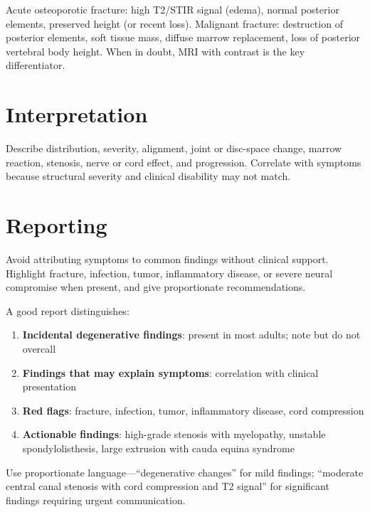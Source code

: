 \begin{pearlbox}
Acute osteoporotic fracture: high T2/STIR signal (edema), normal posterior elements, preserved height (or recent loss). Malignant fracture: destruction of posterior elements, soft tissue mass, diffuse marrow replacement, loss of posterior vertebral body height. When in doubt, MRI with contrast is the key differentiator.
\end{pearlbox}

\section{Interpretation}
Describe distribution, severity, alignment, joint or disc-space change, marrow reaction, stenosis, nerve or cord effect, and progression. Correlate with symptoms because structural severity and clinical disability may not match.

\section{Reporting}
Avoid attributing symptoms to common findings without clinical support. Highlight fracture, infection, tumor, inflammatory disease, or severe neural compromise when present, and give proportionate recommendations.

\begin{pearlbox}
A good report distinguishes:
\begin{enumerate}
  \item \textbf{Incidental degenerative findings}: present in most adults; note but do not overcall
  \item \textbf{Findings that may explain symptoms}: correlation with clinical presentation
  \item \textbf{Red flags}: fracture, infection, tumor, inflammatory disease, cord compression
  \item \textbf{Actionable findings}: high-grade stenosis with myelopathy, unstable spondylolisthesis, large extrusion with cauda equina syndrome
\end{enumerate}
Use proportionate language---``degenerative changes'' for mild findings; ``moderate central canal stenosis with cord compression and T2 signal'' for significant findings requiring urgent communication.
\end{pearlbox}

\clearpage
